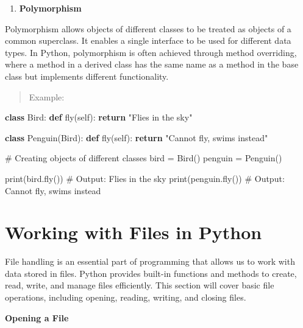 \documentclass[
  letterpaper,
  DIV=11,
  numbers=noendperiod]{scrreprt}
\newenvironment{Shaded}{\begin{snugshade}}{\end{snugshade}}
\newcommand{\BuiltInTok}[1]{\textcolor[rgb]{0.00,0.23,0.31}{#1}}
\newcommand{\CommentTok}[1]{\textcolor[rgb]{0.37,0.37,0.37}{#1}}
\newcommand{\ControlFlowTok}[1]{\textcolor[rgb]{0.00,0.23,0.31}{\textbf{#1}}}
\newcommand{\KeywordTok}[1]{\textcolor[rgb]{0.00,0.23,0.31}{\textbf{#1}}}
\newcommand{\NormalTok}[1]{\textcolor[rgb]{0.00,0.23,0.31}{#1}}
\newcommand{\OperatorTok}[1]{\textcolor[rgb]{0.37,0.37,0.37}{#1}}
\newcommand{\StringTok}[1]{\textcolor[rgb]{0.13,0.47,0.30}{#1}}
\newcommand{\VariableTok}[1]{\textcolor[rgb]{0.07,0.07,0.07}{#1}}
\providecommand{\tightlist}{%
  \setlength{\itemsep}{0pt}\setlength{\parskip}{0pt}}\usepackage{longtable,booktabs,array}
\theoremstyle{plain}
\theoremstyle{definition}
\theoremstyle{remark}
\begin{document}
\begin{enumerate}
\def\labelenumi{\arabic{enumi}.}
\setcounter{enumi}{3}
\tightlist
\item
  \textbf{Polymorphism}
\end{enumerate}

Polymorphism allows objects of different classes to be treated as
objects of a common superclass. It enables a single interface to be used
for different data types. In Python, polymorphism is often achieved
through method overriding, where a method in a derived class has the
same name as a method in the base class but implements different
functionality.

\begin{quote}
Example:
\end{quote}

\begin{Shaded}
\begin{Highlighting}[]
\KeywordTok{class}\NormalTok{ Bird:}
    \KeywordTok{def}\NormalTok{ fly(}\VariableTok{self}\NormalTok{):}
        \ControlFlowTok{return} \StringTok{"Flies in the sky"}

\KeywordTok{class}\NormalTok{ Penguin(Bird):}
    \KeywordTok{def}\NormalTok{ fly(}\VariableTok{self}\NormalTok{):}
        \ControlFlowTok{return} \StringTok{"Cannot fly, swims instead"}

\CommentTok{\# Creating objects of different classes}
\NormalTok{bird }\OperatorTok{=}\NormalTok{ Bird()}
\NormalTok{penguin }\OperatorTok{=}\NormalTok{ Penguin()}

\BuiltInTok{print}\NormalTok{(bird.fly())      }\CommentTok{\# Output: Flies in the sky}
\BuiltInTok{print}\NormalTok{(penguin.fly())  }\CommentTok{\# Output: Cannot fly, swims instead}
\end{Highlighting}
\end{Shaded}

\section{Working with Files in
Python}\label{working-with-files-in-python}

File handling is an essential part of programming that allows us to work
with data stored in files. Python provides built-in functions and
methods to create, read, write, and manage files efficiently. This
section will cover basic file operations, including opening, reading,
writing, and closing files.

\textbf{Opening a File}
\end{document}
